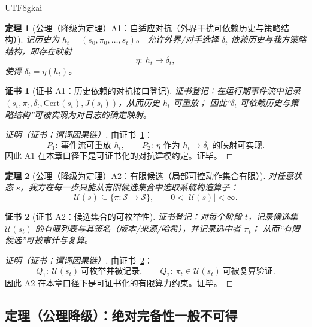 \documentclass[12pt]{article}
\newtheorem{theorem}{定理}[section]
\newtheorem{Certificate}{证书}[section]
\newcommand{\Cert}{\ensuremath{\mathrm{Cert}}}
\begin{document}
\begin{CJK*}{UTF8}{gkai}
\begin{theorem}[公理（降级为定理）A1：自适应对抗（外界干扰可依赖历史与策略结构）]
\label{thm:tex25-axiom-a1-adaptive}
记历史为 $h_t=(s_0,\pi_0,\dots,s_t)$。
允许外界/对手选择 $\delta_t$ 依赖历史与我方策略结构，即存在映射
\[
  \eta:\ h_t\mapsto \delta_t,
\]
使得 $\delta_t=\eta(h_t)$。
\end{theorem}

\begin{Certificate}[证书 A1：历史依赖的对抗接口登记]
\label{cert:tex25-a1-adaptive}
证书登记：在运行期事件流中记录 $(s_t,\pi_t,\delta_t,\Cert(s_t),J(s_t))$，从而历史 $h_t$ 可重放；
因此“$\delta_t$ 可依赖历史与策略结构”可被实现为对日志的确定映射。
\end{Certificate}

\begin{proof}[证明（证书；谓词因果链）]
由证书~\ref{cert:tex25-a1-adaptive}：
\[
  P_1:\ \text{事件流可重放 } h_t,\qquad
  P_2:\ \eta\text{ 作为 }h_t\mapsto\delta_t\text{ 的映射可实现}.
\]
因此 A1 在本章口径下是可证书化的对抗建模约定。证毕。
\end{proof}

\begin{theorem}[公理（降级为定理）A2：有限候选（局部可控动作集合有限）]
\label{thm:tex25-axiom-a2-finite}
对任意状态 $s$，我方在每一步只能从有限候选集合中选取系统构造算子：
\[
  \mathcal{U}(s)\subseteq \{\pi:\mathcal{S}\to\mathcal{S}\},
  \qquad
  0<|\mathcal{U}(s)|<\infty.
\]
\end{theorem}

\begin{Certificate}[证书 A2：候选集合的可枚举性]
\label{cert:tex25-a2-finite}
证书登记：对每个阶段 $t$，记录候选集 $\mathcal{U}(s_t)$ 的有限列表与其签名（版本/来源/哈希），并记录选中者 $\pi_t$；
从而“有限候选”可被审计与复算。
\end{Certificate}

\begin{proof}[证明（证书；谓词因果链）]
由证书~\ref{cert:tex25-a2-finite}：
\[
  Q_1:\ \mathcal{U}(s_t)\ \text{可枚举并被记录},\qquad
  Q_2:\ \pi_t\in\mathcal{U}(s_t)\ \text{可被复算验证}.
\]
因此 A2 在本章口径下是可证书化的有限算力约束。证毕。
\end{proof}

\subsection{定理（公理降级）：绝对完备性一般不可得}
\label{subsec:tex25-theorem-absolute}


\end{CJK*}
\end{document}
